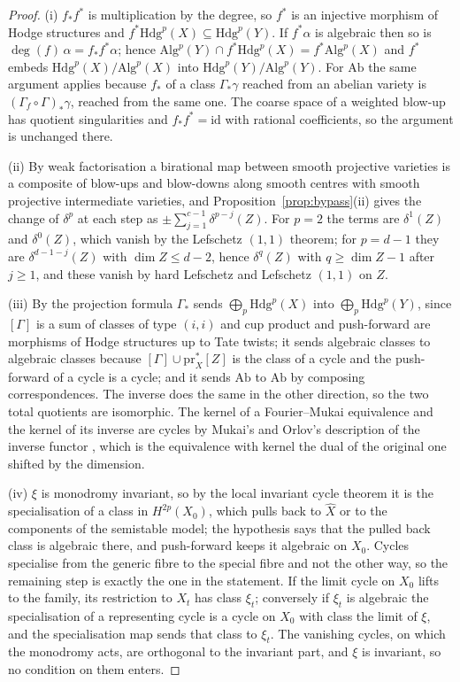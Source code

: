 \documentclass[11pt,reqno]{amsart}
\numberwithin{equation}{section}
\theoremstyle{plain}
\theoremstyle{definition}
\newcommand{\Hdg}{\mathrm{Hdg}}
\newcommand{\Ab}{\mathrm{Ab}}
\newcommand{\Alg}{\mathrm{Alg}}
\begin{document}
\begin{proof}
(i) $f_{*}f^{*}$ is multiplication by the degree, so $f^{*}$ is an injective morphism of Hodge structures and $f^{*}\Hdg^{p}(X)\subseteq\Hdg^{p}(Y)$. If $f^{*}\alpha$ is algebraic then so is $\deg(f)\,\alpha=f_{*}f^{*}\alpha$; hence $\Alg^{p}(Y)\cap f^{*}\Hdg^{p}(X)=f^{*}\Alg^{p}(X)$ and $f^{*}$ embeds $\Hdg^{p}(X)/\Alg^{p}(X)$ into $\Hdg^{p}(Y)/\Alg^{p}(Y)$. For $\Ab$ the same argument applies because $f_{*}$ of a class $\Gamma_{*}\gamma$ reached from an abelian variety is $(\Gamma_{f}\circ\Gamma)_{*}\gamma$, reached from the same one. The coarse space of a weighted blow-up has quotient singularities and $f_{*}f^{*}=\mathrm{id}$ with rational coefficients, so the argument is unchanged there.

(ii) By weak factorisation \cite{AKMW02} a birational map between smooth projective varieties is a composite of blow-ups and blow-downs along smooth centres with smooth projective intermediate varieties, and Proposition~\ref{prop:bypass}(ii) gives the change of $\delta^{p}$ at each step as $\pm\sum_{j=1}^{c-1}\delta^{p-j}(Z)$. For $p=2$ the terms are $\delta^{1}(Z)$ and $\delta^{0}(Z)$, which vanish by the Lefschetz $(1,1)$ theorem; for $p=d-1$ they are $\delta^{d-1-j}(Z)$ with $\dim Z\le d-2$, hence $\delta^{q}(Z)$ with $q\ge\dim Z-1$ after $j\ge1$, and these vanish by hard Lefschetz and Lefschetz $(1,1)$ on $Z$.

(iii) By the projection formula $\Gamma_{*}$ sends $\bigoplus_{p}\Hdg^{p}(X)$ into $\bigoplus_{p}\Hdg^{p}(Y)$, since $[\Gamma]$ is a sum of classes of type $(i,i)$ and cup product and push-forward are morphisms of Hodge structures up to Tate twists; it sends algebraic classes to algebraic classes because $[\Gamma]\cup\mathrm{pr}_{X}^{*}[Z]$ is the class of a cycle and the push-forward of a cycle is a cycle; and it sends $\Ab$ to $\Ab$ by composing correspondences. The inverse does the same in the other direction, so the two total quotients are isomorphic. The kernel of a Fourier--Mukai equivalence and the kernel of its inverse are cycles by Mukai's and Orlov's description of the inverse functor \cite{Orl97}, which is the equivalence with kernel the dual of the original one shifted by the dimension.

(iv) $\xi$ is monodromy invariant, so by the local invariant cycle theorem it is the specialisation of a class in $H^{2p}(X_{0})$, which pulls back to $\hat X$ or to the components of the semistable model; the hypothesis says that the pulled back class is algebraic there, and push-forward keeps it algebraic on $X_{0}$. Cycles specialise from the generic fibre to the special fibre \cite[Ch.~20]{Ful98} and not the other way, so the remaining step is exactly the one in the statement. If the limit cycle on $X_{0}$ lifts to the family, its restriction to $X_{t}$ has class $\xi_{t}$; conversely if $\xi_{t}$ is algebraic the specialisation of a representing cycle is a cycle on $X_{0}$ with class the limit of $\xi$, and the specialisation map sends that class to $\xi_{t}$. The vanishing cycles, on which the monodromy acts, are orthogonal to the invariant part, and $\xi$ is invariant, so no condition on them enters.
\end{proof}
\end{document}
